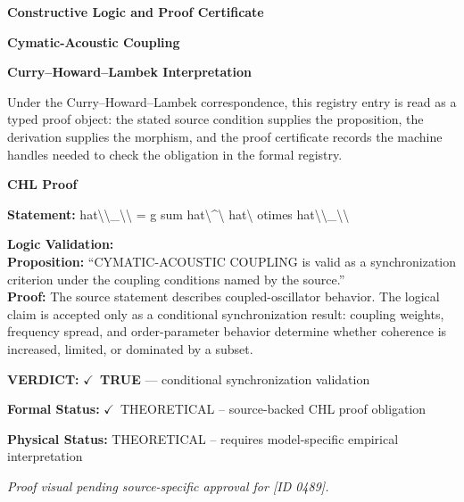 \clearpage
\begingroup\tzpsupportsetup
\noindent\textbf{\fontsize{10.8pt}{12.8pt}\selectfont [ID 0489] Constructive Logic and Proof Certificate}\par
\noindent\textbf{\fontsize{10pt}{12pt}\selectfont Cymatic-Acoustic Coupling}\par
\vspace{0.45em}
\begingroup
\footnotesize
\setlength{\parskip}{0.22em}
\setlength{\parindent}{0pt}
\noindent\textbf{Curry--Howard--Lambek Interpretation}\par
Under the Curry--Howard--Lambek correspondence, this registry entry is read as a typed proof
object: the stated source condition supplies the proposition, the derivation supplies the
morphism, and the proof certificate records the machine handles needed to check the obligation
in the formal registry.

\vspace{0.45em}
\noindent\textbf{CHL Proof}\par
\textbf{Statement:} hat\textbackslash{}\textbackslash{}\_\textbackslash{}\textbackslash{} = g sum hat\textbackslash{}\textasciicircum{}\textbackslash{} hat\textbackslash{} otimes hat\textbackslash{}\textbackslash{}\_\textbackslash{}\textbackslash{}

\textbf{Logic Validation:}\\
\textbf{Proposition:} ``CYMATIC-ACOUSTIC COUPLING is valid as a synchronization criterion under the coupling
conditions named by the source.''\\
\textbf{Proof:} The source statement describes coupled-oscillator behavior. The logical claim is
accepted only as a conditional synchronization result: coupling weights, frequency
spread, and order-parameter behavior determine whether coherence is increased, limited,
or dominated by a subset.

\textbf{VERDICT:} \ensuremath{\checkmark}\ \textbf{TRUE} --- conditional synchronization validation

\textbf{Formal Status:} \ensuremath{\checkmark}\ THEORETICAL -- source-backed CHL proof obligation

\textbf{Physical Status:} THEORETICAL -- requires model-specific empirical interpretation
\par\vspace{0.45em}
\par
\vfill
\begingroup\footnotesize\itshape
Proof visual pending source-specific approval for [ID 0489].
\par\endgroup
\vfill
\endgroup
\endgroup
